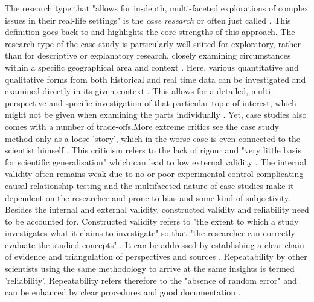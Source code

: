 The research type that "allows for in-depth, multi-faceted explorations of complex issues in their real-life settings" \autocite{croweCaseStudyApproach2011} is the \textit{case research} or often just called . This definition goes back to \autocite{yinCaseStudyResearch1984} and highlights the core strengths of this approach. The research type of the case study is particularly well suited for exploratory, rather than for descriptive or explanatory research, closely examining circumstances within a specific geographical area and context \autocite{zainalCaseStudyResearch2007}. Here, various quantitative and qualitative forms from both historical and real time data can be investigated and examined directly in its given context \autocite{fitzgeraldCaseStudiesResearch1999}. This allows for a detailed, multi-perspective and specific investigation of that particular topic of interest, which might not be given when examining the parts individually \autocite{pelzResearchMethodsSocial, zainalCaseStudyResearch2007}. Yet, case studies also comes with a number of trade-offs.\linebreak[1]
More extreme critics see the case study method only as a loose 'story', which in the worse case is even connected to the scientist himself \autocite{fitzgeraldCaseStudiesResearch1999}. This criticism refers to the lack of rigour and "very little basis for scientific generalisation" which can lead to low external validity \autocites{yinCaseStudyResearch1984}[5]{zainalCaseStudyResearch2007}. The internal validity often remains weak due to no or poor experimental control complicating causal relationship testing and the multifaceted nature of case studies make it dependent on the researcher and prone to bias and some kind of subjectivity. Besides the internal and external validity, constructed validity and reliability need to be accounted for. Constructed validity refers to "the extent to which a study investigates what it claims to investigate" \autocite[3]{gibbertWhatPassesRigorous2008} so that "the researcher can correctly evaluate the studied concepts" \autocite[277]{ferreiraHowImproveValidity2020}. It can be addressed by establishing a clear chain of evidence and triangulation of perspectives and sources \autocite{gibbertWhatPassesRigorous2008}. Repeatability by other scientists using the same methodology to arrive at the same insights is termed 'reliability'. Repeatability refers therefore to the "absence of random error" and can be enhanced by clear procedures and good documentation \autocite[5]{gibbertWhatPassesRigorous2008}.\linebreak[1]
